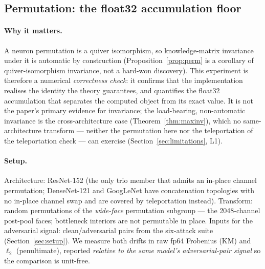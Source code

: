 
\subsection{Permutation: the float32 accumulation floor}
\label{sec:study1a}

\paragraph{Why it matters.}
A neuron permutation is a quiver isomorphism, so knowledge-matrix
invariance under it is automatic by construction
(Proposition~\ref{prop:perm} is a corollary of quiver-isomorphism
invariance, not a hard-won discovery). This experiment is therefore a
numerical \emph{correctness check}: it confirms that the implementation
realises the identity the theory guarantees, and quantifies the float32
accumulation that separates the computed object from its exact value. It
is not the paper's primary evidence for invariance; the load-bearing,
non-automatic invariance is the cross-architecture case
(Theorem~\ref{thm:maxinv}), which no same-architecture transform --- neither the
permutation here nor the teleportation of the teleportation check --- can exercise
(Section~\ref{sec:limitations}, L1).

\paragraph{Setup.}
Architecture: ResNet-152 (the only trio member that admits an in-place
channel permutation; DenseNet-121 and GoogLeNet have concatenation
topologies with no in-place channel swap and are covered by
teleportation instead). Transform: random permutations of the
\emph{wide-face} permutation subgroup --- the 2048-channel post-pool
faces; bottleneck interiors are not permutable in place. Inputs for the
adversarial signal: clean/adversarial pairs from the six-attack suite
(Section~\ref{sec:setup}). We measure both drifts in raw fp64 Frobenius
(KM) and $\ell_2$ (penultimate), reported \emph{relative to the same
model's adversarial-pair signal} so the comparison is unit-free.

